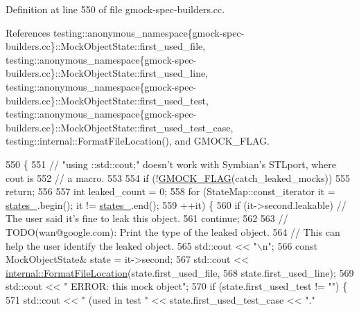 Definition at line 550 of file gmock-\/spec-\/builders.\+cc.



References testing\+::anonymous\+\_\+namespace\{gmock-\/spec-\/builders.\+cc\}\+::\+Mock\+Object\+State\+::first\+\_\+used\+\_\+file, testing\+::anonymous\+\_\+namespace\{gmock-\/spec-\/builders.\+cc\}\+::\+Mock\+Object\+State\+::first\+\_\+used\+\_\+line, testing\+::anonymous\+\_\+namespace\{gmock-\/spec-\/builders.\+cc\}\+::\+Mock\+Object\+State\+::first\+\_\+used\+\_\+test, testing\+::anonymous\+\_\+namespace\{gmock-\/spec-\/builders.\+cc\}\+::\+Mock\+Object\+State\+::first\+\_\+used\+\_\+test\+\_\+case, testing\+::internal\+::\+Format\+File\+Location(), and G\+M\+O\+C\+K\+\_\+\+F\+L\+AG.


\begin{DoxyCode}
550                         \{
551     \textcolor{comment}{// "using ::std::cout;" doesn't work with Symbian's STLport, where cout is}
552     \textcolor{comment}{// a macro.}
553 
554     \textcolor{keywordflow}{if} (!\hyperlink{gmock-port_8h_ad7119adfef06be5e7b1551633f5a1436}{GMOCK\_FLAG}(catch\_leaked\_mocks))
555       \textcolor{keywordflow}{return};
556 
557     \textcolor{keywordtype}{int} leaked\_count = 0;
558     \textcolor{keywordflow}{for} (StateMap::const\_iterator it = \hyperlink{classtesting_1_1anonymous__namespace_02gmock-spec-builders_8cc_03_1_1MockObjectRegistry_a6edd3b24e40aeef22219a0a423f40c60}{states\_}.begin(); it != \hyperlink{classtesting_1_1anonymous__namespace_02gmock-spec-builders_8cc_03_1_1MockObjectRegistry_a6edd3b24e40aeef22219a0a423f40c60}{states\_}.end();
559          ++it) \{
560       \textcolor{keywordflow}{if} (it->second.leakable)  \textcolor{comment}{// The user said it's fine to leak this object.}
561         \textcolor{keywordflow}{continue};
562 
563       \textcolor{comment}{// TODO(wan@google.com): Print the type of the leaked object.}
564       \textcolor{comment}{// This can help the user identify the leaked object.}
565       std::cout << \textcolor{stringliteral}{"\(\backslash\)n"};
566       \textcolor{keyword}{const} MockObjectState& state = it->second;
567       std::cout << \hyperlink{namespacetesting_1_1internal_a31b7c3abed4a7c395f42c61e993989f4}{internal::FormatFileLocation}(state.first\_used\_file,
568                                                 state.first\_used\_line);
569       std::cout << \textcolor{stringliteral}{" ERROR: this mock object"};
570       \textcolor{keywordflow}{if} (state.first\_used\_test != \textcolor{stringliteral}{""}) \{
571         std::cout << \textcolor{stringliteral}{" (used in test "} << state.first\_used\_test\_case << \textcolor{stringliteral}{"."}

\end{DoxyCode}
